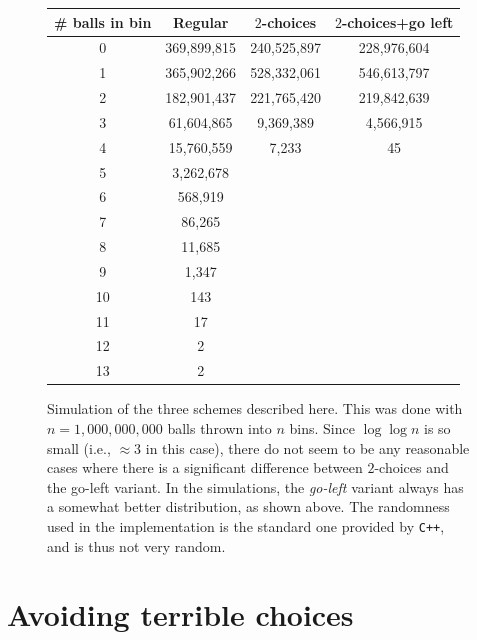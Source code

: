 \begin{figure}
    \centering%
       \begin{tabular}{|c|c|c|c|}
         \hline
         \# balls in bin & Regular & $2$-choices & $2$-choices+go left\\ 
         \hline
         \hline
         0 & 369,899,815  &  240,525,897  &  228,976,604 \\
         1 & 365,902,266  &  528,332,061  &  546,613,797 \\
         2 & 182,901,437  &  221,765,420  &  219,842,639 \\
         3 &  61,604,865  &    9,369,389  &    4,566,915 \\
         4 &  15,760,559  &        7,233  &           45 \\
         5 &   3,262,678  &               &              \\
         6 &     568,919  &               &              \\
         7 &      86,265  &               &              \\
         8 &      11,685  &               &              \\
         9 &       1,347  &               &              \\
         10 &         143  &               &              \\
         11 &          17  &               &              \\
         12 &           2  &               &              \\
         13 &           2  &               &
         \\
         \hline
       \end{tabular}%
       \caption{Simulation of the three schemes described here. This was
          done with $n=1,000,000,000$ balls thrown into $n$ bins. Since
          $\log \log n$ is so small (i.e., $\approx 3$ in this case), there do
          not seem to be any reasonable cases where there is a
          significant difference between $2$-choices and the go-left
          variant. In the simulations, the \emph{go-left} variant always
          has a somewhat better distribution, as shown above. The randomness used in the implementation is the standard one provided by \texttt{C++}, and is thus not very random.}
\end{figure}


\section{Avoiding terrible choices}


